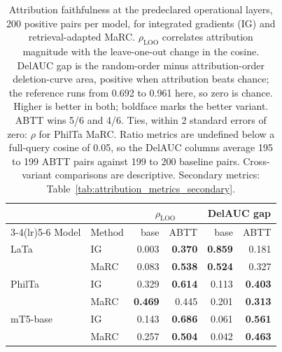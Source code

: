 \begin{table}[t]
\centering
\small
\setlength{\tabcolsep}{4pt}
\begin{tabular}{llrrrr}
\toprule
& & \multicolumn{2}{c}{$\rho_{\text{LOO}}$} & \multicolumn{2}{c}{DelAUC gap} \\
\cmidrule(lr){3-4}\cmidrule(lr){5-6}
Model & Method & base & ABTT & base & ABTT \\
\midrule
LaTa & IG & 0.003 & \textbf{0.370} & \textbf{0.859} & 0.181 \\
 & MaRC & 0.083 & \textbf{0.538} & \textbf{0.524} & 0.327 \\
\addlinespace[2pt]
PhilTa & IG & 0.329 & \textbf{0.614} & 0.113 & \textbf{0.403} \\
 & MaRC & \textbf{0.469} & 0.445 & 0.201 & \textbf{0.313} \\
\addlinespace[2pt]
mT5-base & IG & 0.143 & \textbf{0.686} & 0.061 & \textbf{0.561} \\
 & MaRC & 0.257 & \textbf{0.504} & 0.042 & \textbf{0.463} \\
\bottomrule
\end{tabular}
\caption{Attribution faithfulness at the predeclared operational layers, 200 positive pairs per model, for integrated gradients (IG) and retrieval-adapted MaRC. $\rho_{\text{LOO}}$ correlates attribution magnitude with the leave-one-out change in the cosine. DelAUC gap is the random-order minus attribution-order deletion-curve area, positive when attribution beats chance; the reference runs from 0.692 to 0.961 here, so zero is chance. Higher is better in both; boldface marks the better variant. ABTT wins 5/6 and 4/6. Ties, within 2 standard errors of zero: $\rho$ for PhilTa MaRC. Ratio metrics are undefined below a full-query cosine of 0.05, so the DelAUC columns average 195 to 199 ABTT pairs against 199 to 200 baseline pairs. Cross-variant comparisons are descriptive. Secondary metrics: Table~\ref{tab:attribution_metrics_secondary}.}
\label{tab:attribution_metrics_main}
\end{table}
